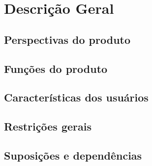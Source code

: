 \chapter{Descrição Geral}

\section{Perspectivas do produto}

\section{Funções do produto}

\section{Características dos usuários}

\section{Restrições gerais}

\section{Suposições e dependências}